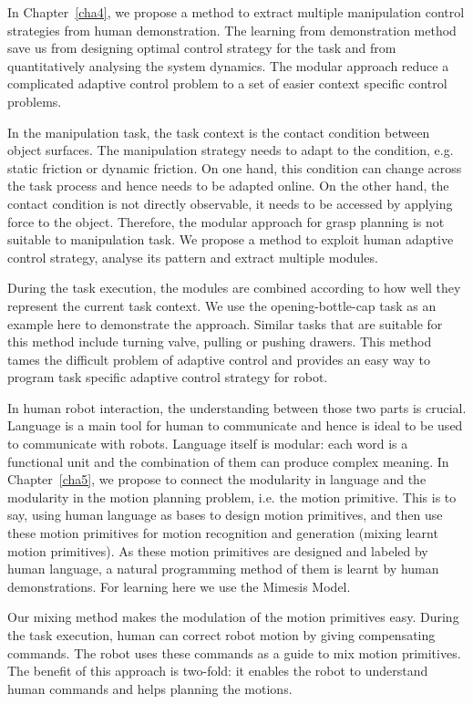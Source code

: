 In Chapter~\ref{cha4}, we propose a method to extract multiple manipulation control strategies from human demonstration. The learning from demonstration method save us from designing optimal control strategy for the task and from quantitatively analysing the system dynamics. The modular approach reduce a complicated adaptive control problem to a set of easier context specific control problems.

In the manipulation task, the task context is the contact condition between object surfaces. The manipulation strategy needs to adapt to the condition, e.g. static friction or dynamic friction. On one hand, this condition can change across the task process and hence needs to be adapted online. On the other hand, the contact condition is not directly observable, it needs to be accessed by applying force to the object. Therefore, the modular approach for grasp planning is not suitable to manipulation task. We propose a method to exploit human adaptive control strategy, analyse its pattern and extract multiple modules.

During the task execution, the modules are combined according to how well they represent the current task context. We use the opening-bottle-cap task as an example here to demonstrate the approach. Similar tasks that are suitable for this method include turning valve, pulling or pushing drawers. This method tames the difficult problem of adaptive control and
provides an easy way to program task specific adaptive control strategy for robot. %

In human robot interaction, the understanding between those two parts is crucial. Language is a main tool for human to communicate and hence is ideal to be used to communicate with robots. Language itself is modular: each word is a functional unit and the combination of them can produce complex meaning. In Chapter~\ref{cha5}, we propose to connect the modularity in language and the modularity in the motion planning problem, i.e. the motion primitive. This is to say, using human language as bases to design motion primitives, and then use these motion primitives for motion recognition and generation (mixing learnt motion primitives). As these motion primitives are designed and labeled by human language, a natural programming method of them is learnt by human demonstrations. For learning here we use the Mimesis Model.

Our mixing method makes the modulation of the motion primitives easy. During the task execution, human can correct robot motion by giving compensating commands. The robot uses these commands as a guide to mix motion primitives. The benefit of this approach is two-fold: it enables the robot to understand human commands and helps planning the motions.

